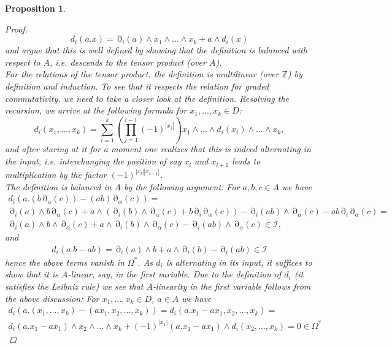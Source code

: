 \documentclass[10pt, a4paper, UKenglish]{article}
\numberwithin{equation}{section}
\newcommand{\cI}{\mathcal{I}}
\newcommand{\bZ}{\mathbb{Z}}
\newcommand{\abs}[1]{\left\vert#1\right\vert}	%
\theoremstyle{plain}
\newtheorem{prop}[equation]{Proposition}
\theoremstyle{definition}
\newcommand{\del}{\operatorname{\partial}}
\begin{document}
\begin{prop}
\begin{proof}
\[
  d_i (a.x) = \del_i(a) \wedge %
  x_1 \wedge \ldots \wedge x_k + a \wedge d_i(x)
\]
and argue that this is well defined by showing that the definition is balanced with respect to $A$, i.e. descends to the tensor product (over $A$).\\
For the relations of the tensor product, the definition is multilinear (over $\bZ$) by definition and induction. To see that it respects the relation for graded commutativity, we need to take a closer look at the definition. Resolving the recursion, we arrive at the following formula for $x_1, \ldots, x_k \in D$:
\begin{equation*}
  d_i (x_1, \ldots , x_k) = %
  \sum_{i=1}^k %
  \left( \prod_{j=1}^{i-1} (-1)^{\abs{x_j}} \right) %
  x_1 \wedge \ldots \wedge d_i (x_i) %
  \wedge \ldots \wedge x_k,
\end{equation*}
and after staring at it for a moment one realizes that this is indeed alternating in the input, i.e. interchanging the position of say $x_l$ and $x_{l+1}$ leads to multiplication by the factor $(-1)^{\abs{x_l}\abs{x_{l+1}}}$.\\
The definition is balanced in $A$ by the following argument: For $a,b,c \in A$ we have
\begin{gather*}
  d_i ( a . (b \del_\alpha (c)) - %
    (ab) \del_\alpha (c) ) = \\ %
  \del_i(a) \wedge b \del_\alpha(c) + %
    a \wedge ( \del_i(b) \wedge \del_\alpha (c) + %
      b \del_i \del_\alpha (c) ) - %
    \del_i(ab) \wedge \del_\alpha (c) - %
    ab \del_i \del_\alpha (c) = \\%
  \del_i (a) \wedge b \wedge \del_\alpha (c) + %
    a \wedge \del_i (b) \wedge \del_\alpha (c) - %
    \del_i (ab) \wedge \del_\alpha (c) \in \cI,%
\end{gather*}
and
\begin{gather*}
  d_i(a.b - ab) = \del_i (a) \wedge b + a \wedge \del_i (b) - \del_i (ab) \in \cI
\end{gather*}
hence the above terms vanish in $\Omega^*$. As $d_i$ is alternating in its input, it suffices to show that it is $A$-linear, say, in the first variable. Due to the definition of $d_i$ (it satisfies the Leibniz rule) we see that $A$-linearity in the first variable follows from the above discussion: For $x_1 , \ldots , x_k \in D$, $a \in A$ we have
\begin{gather*}
  d_i (a. (x_1, \ldots, x_k) - (a x_1, x_2, \ldots, x_k)) = %
  d_i (a.x_1 - a x_1, x_2, \ldots , x_k) = \\ %
  d_i (a.x_1 - a x_1) \wedge x_2 \wedge \ldots \wedge x_k + (-1)^{\abs{x_1}} (a.x_1 - a x_1) \wedge d_i (x_2, \ldots , x_k) = 0 \in \Omega^* %

\end{gather*}
\end{proof}
\end{prop}
\end{document}
